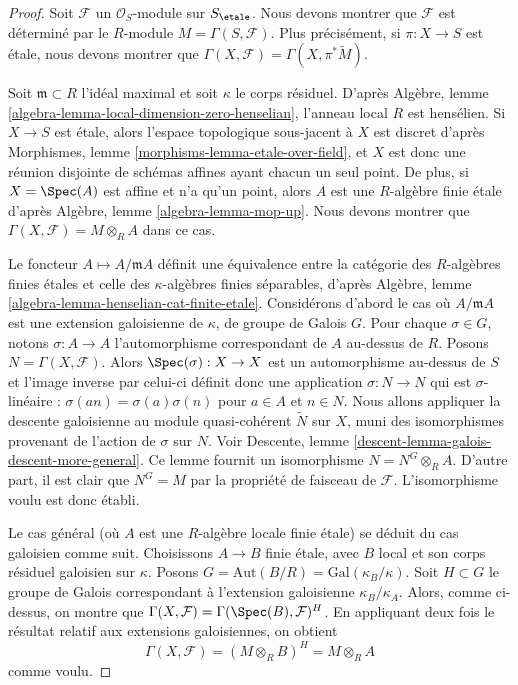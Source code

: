 \begin{proof}
Soit $\mathcal{F}$ un $\mathcal{O}_S$-module sur $S_\etale$.
Nous devons montrer que $\mathcal{F}$ est d\'etermin\'e par le
$R$-module $M = \Gamma(S, \mathcal{F})$.
Plus pr\'ecis\'ement, si $\pi : X \to S$ est \'etale, nous devons
montrer que $\Gamma(X, \mathcal{F}) = \Gamma(X, \pi^*\widetilde{M})$.

\medskip\noindent
Soit $\mathfrak m \subset R$ l'id\'eal maximal et soit
$\kappa$ le corps r\'esiduel. D'apr\`es
Alg\`ebre, lemme \ref{algebra-lemma-local-dimension-zero-henselian},
l'anneau local $R$ est hens\'elien. Si $X \to S$ est \'etale,
alors l'espace topologique sous-jacent \`a $X$ est discret
d'apr\`es Morphismes, lemme \ref{morphisms-lemma-etale-over-field},
et $X$ est donc une r\'eunion disjointe de sch\'emas affines
ayant chacun un seul point. De plus, si $X = \Spec(A)$ est affine et
n'a qu'un point, alors $A$ est une $R$-alg\`ebre finie \'etale d'apr\`es
Alg\`ebre, lemme \ref{algebra-lemma-mop-up}.
Nous devons montrer que $\Gamma(X, \mathcal{F}) = M \otimes_R A$
dans ce cas.

\medskip\noindent
Le foncteur $A \mapsto A/\mathfrak m A$ d\'efinit une \'equivalence entre
la cat\'egorie des $R$-alg\`ebres finies \'etales
et celle des $\kappa$-alg\`ebres finies s\'eparables, d'apr\`es
Alg\`ebre, lemme \ref{algebra-lemma-henselian-cat-finite-etale}.
Consid\'erons d'abord le cas o\`u $A/\mathfrak m A$
est une extension galoisienne de $\kappa$, de groupe de Galois $G$.
Pour chaque $\sigma \in G$, notons $\sigma : A \to A$
l'automorphisme correspondant de $A$ au-dessus de $R$.
Posons $N = \Gamma(X, \mathcal{F})$.
Alors $\Spec(\sigma) : X \to X$ est un automorphisme au-dessus de $S$
et l'image inverse par celui-ci d\'efinit donc une application $\sigma : N \to N$
qui est $\sigma$-lin\'eaire : $\sigma(an) = \sigma(a) \sigma(n)$
pour $a \in A$ et $n \in N$.
Nous allons appliquer la descente galoisienne au module quasi-coh\'erent
$\widetilde{N}$ sur $X$, muni des isomorphismes
provenant de l'action de $\sigma$ sur $N$. Voir Descente, lemme
\ref{descent-lemma-galois-descent-more-general}.
Ce lemme fournit un isomorphisme $N = N^G \otimes_R A$.
D'autre part, il est clair que $N^G = M$ par la propri\'et\'e de faisceau
de $\mathcal{F}$. L'isomorphisme voulu est donc \'etabli.

\medskip\noindent
Le cas g\'en\'eral (o\`u $A$ est une $R$-alg\`ebre locale finie \'etale)
se d\'eduit du cas galoisien comme suit. Choisissons $A \to B$
finie \'etale, avec $B$ local et son corps r\'esiduel
galoisien sur $\kappa$. Posons $G = \text{Aut}(B/R) = \text{Gal}(\kappa_B/\kappa)$.
Soit $H \subset G$ le groupe de Galois correspondant \`a
l'extension galoisienne $\kappa_B/\kappa_A$. Alors, comme ci-dessus, on
montre que $\Gamma(X, \mathcal{F}) = \Gamma(\Spec(B), \mathcal{F})^H$.
En appliquant deux fois le r\'esultat relatif aux extensions galoisiennes, on obtient
$$
\Gamma(X, \mathcal{F}) = (M \otimes_R B)^H = M \otimes_R A
$$
comme voulu.
\end{proof}








